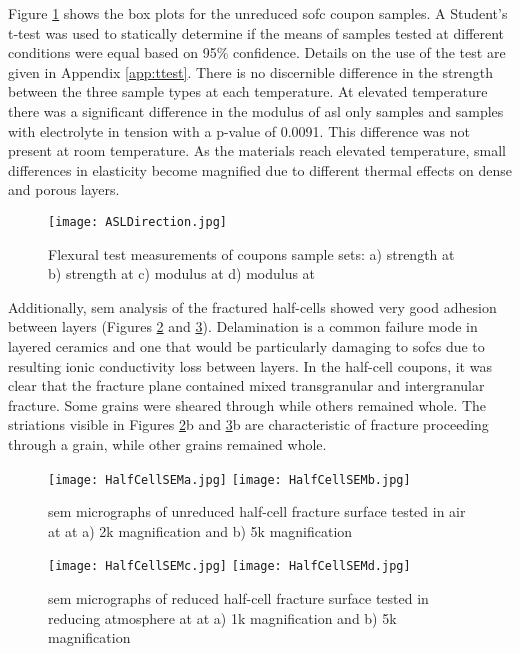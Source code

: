 Figure \ref{fig:ASLDirection} shows the box plots for the unreduced \gls{sofc} coupon samples.
A Student's t-test was used to statically determine if the means of samples tested at different conditions were equal based on 95\% confidence.
Details on the use of the test are given in Appendix \ref{app:ttest}.
There is no discernible difference in the strength between the three sample types at each temperature.
At elevated temperature there was a significant difference in the modulus of \gls{asl} only samples and samples with electrolyte in tension with a p-value of 0.0091.
This difference was not present at room temperature.
As the materials reach elevated temperature, small differences in elasticity become magnified due to different thermal effects on dense and porous layers.
\begin{figure}
    \texttt{[image: ASLDirection.jpg]}
    \caption{Flexural test measurements of coupons sample sets: a) strength at  b) strength at  c) modulus at  d) modulus at }
    \label{fig:ASLDirection}
\end{figure}

Additionally, \gls{sem} analysis of the fractured half-cells showed very good adhesion between layers (Figures \ref{fig:HalfCellSEMa} and \ref{fig:HalfCellSEMb}).
Delamination is a common failure mode in layered ceramics and one that would be particularly damaging to \glspl{sofc} due to resulting ionic conductivity loss between layers.\cite{Sevecek2016}
In the half-cell coupons, it was clear that the fracture plane contained mixed transgranular and intergranular fracture.
Some grains were sheared through while others remained whole.
The striations visible in Figures \ref{fig:HalfCellSEMa}b and \ref{fig:HalfCellSEMb}b are characteristic of fracture proceeding through a grain, while other grains remained whole.
\begin{figure}
    \texttt{[image: HalfCellSEMa.jpg]}
    \texttt{[image: HalfCellSEMb.jpg]}
    \caption{\Gls{sem} micrographs of unreduced half-cell fracture surface tested in air at  at a) 2k magnification and b) 5k magnification}
    \label{fig:HalfCellSEMa}
\end{figure}

\begin{figure}
    \texttt{[image: HalfCellSEMc.jpg]}
    \texttt{[image: HalfCellSEMd.jpg]}
    \caption{\Gls{sem} micrographs of reduced half-cell fracture surface tested in reducing atmosphere at  at a) 1k magnification and b) 5k magnification}
    \label{fig:HalfCellSEMb}
\end{figure}

